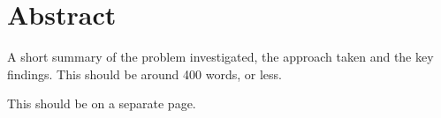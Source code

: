\chapter*{Abstract}
A short summary of the problem investigated, the approach taken and the key findings. This should be around 400 words, or less.

This should be on a separate page.

